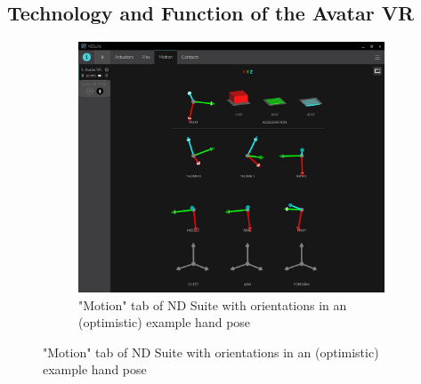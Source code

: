 \documentclass[hyperref, bachelorofscience]{cgvpub}
\begin{document}
\subsection{Technology and Function of the Avatar VR}
\begin{figure}
	\centering
	\begin{subfigure}{\linewidth}
		\includegraphics[width=\linewidth]{../pics/av_imus}
		\caption{"Motion" tab of ND Suite with orientations in an (optimistic) example hand pose}
		\label{fig:av_tech:imus}
	\end{subfigure}
	

\end{figure}
\end{document}
